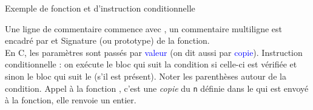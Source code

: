 \documentclass[10pt]{beamer}
\begin{document}
\begin{frame}{\Ctitle}{\stitle}
	\begin{exampleblock}{Exemple de fonction et d'instruction conditionnelle}
		\begin{overprint}
		\medskip
		{\small Une ligne de commentaire commence avec \kw{//}, un commentaire multiligne est encadré par \kw{/*} et \kw{*/}}
		\onslide<2>
		\medskip
		{\small Signature (ou prototype) de la fonction. \\
		\textcolor{BrickRed}{\important} En C, les paramètres sont passés par \textcolor{blue}{valeur} (on dit aussi par \textcolor{blue}{copie}).}
		\onslide<3>
		\medskip
		{\small Instruction conditionnelle : on exécute le bloc qui suit la condition si celle-ci est vérifiée et sinon le bloc qui suit le  (s'il est présent).
		Noter les parenthèses autour de la condition.}
		\onslide<4>
		\medskip
		{\small Appel à la fonction , c'est une \textit{copie} du {\tt n} définie dans le  qui est envoyé à la fonction, elle renvoie un entier.}
		\end{overprint}
	\end{exampleblock}
\end{frame}
\end{document}
